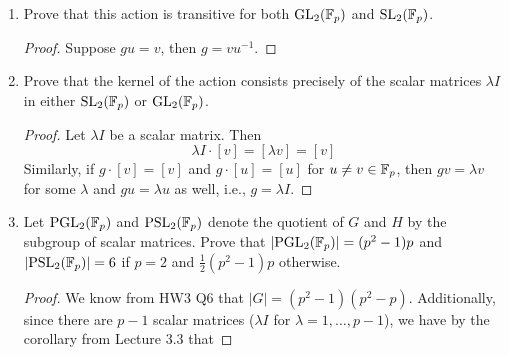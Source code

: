 \documentclass[../psets.tex]{subfiles}
\begin{document}
\begin{enumerate}
\begin{enumerate}
\begin{proof}
            Let $G=\text{GL}_2(\F_p)$. Define $G\acts X$ by left multiplication. To confirm that this is a group action, it will suffice to show that for all $g,h\in G$ and $[v]\in X$, $g\cdot(h\cdot[v])=gh\cdot[v]$ and for all $[v]\in X$, $e\cdot[v]=[v]$. With respect to the first statement, we have since $g,h$ are linear that
            \begin{equation*}
                g\cdot(h\cdot[v]) = g\cdot[hv]
                = [ghv]
                = gh\cdot[v]
            \end{equation*}
            With respect to the latter statement,
            \begin{equation*}
                e\cdot[v] = [ev]
                = [v]
            \end{equation*}
            as desired.\par
            An analogous argument can treat the $\text{SL}_2(\F_p)$ case.
        \end{proof}
        \item Prove that this action is transitive for both $\text{GL}_2(\mathbb{F}_p)$ and $\text{SL}_2(\F_p)$.
        \begin{proof}
            Suppose $gu=v$, then $g=vu^{-1}$.
        \end{proof}
        \item Prove that the kernel of the action consists precisely of the scalar matrices $\lambda I$ in either $\text{SL}_2(\F_p)$ or $\text{GL}_2(\mathbb{F}_p)$.
        \begin{proof}
            Let $\lambda I$ be a scalar matrix. Then
            \begin{equation*}
                \lambda I\cdot[v] = [\lambda v] = [v]
            \end{equation*}
            Similarly, if $g\cdot[v]=[v]$ and $g\cdot[u]=[u]$ for $u\neq v\in\mathbb{F}_p$, then $gv=\lambda v$ for some $\lambda$ and $gu=\lambda u$ as well, i.e., $g=\lambda I$.
        \end{proof}
        \item Let $\text{PGL}_2(\mathbb{F}_p)$ and $\text{PSL}_2(\mathbb{F}_p)$ denote the quotient of $G$ and $H$ by the subgroup of scalar matrices. Prove that $|\text{PGL}_2(\mathbb{F}_p)|=(p^2-1)p$ and $|\text{PSL}_2(\mathbb{F}_p)|=6$ if $p=2$ and $\frac{1}{2}(p^2-1)p$ otherwise.
        \begin{proof}
            We know from HW3 Q6 that $|G|=(p^2-1)(p^2-p)$. Additionally, since there are $p-1$ scalar matrices ($\lambda I$ for $\lambda=1,\dots,p-1$), we have by the corollary from Lecture 3.3 that

\end{proof}
\end{enumerate}
\end{enumerate}
\end{document}
